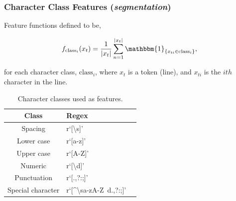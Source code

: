 \documentclass{beamer}
\begin{document}

\begin{frame}
\frametitle{Character Class Features (\emph{segmentation})}

Feature functions defined to be,

$$
f_{\text{class}_i}(x_t) = \frac{1}{|x_t|}\sum_{n=1}^{|x_t|} \mathbbm{1}_{\{x_{ti} \in \text{class}_i\}},
$$

for each character class, $\text{class}_i$, where $x_t$ is a token (line), and $x_{ti}$ is the $ith$ character in the line.

\begin{table}[h]
\begin{center}
\begin{tabular}{|c|l|l|}
\hline
Class & Regex\\
\hline
\hline
Spacing & r`[\textbackslash s]'\\
Lower case & r`[a-z]'\\
Upper case & r`[A-Z]'\\
Numeric & r`[\textbackslash d]'\\
Punctuation & r`[\(\).,?:;]'\\
Special character & r`[\^{}\textbackslash sa-zA-Z\ d\(\).,?:;]'\\
\hline
\end{tabular}
\caption[]{Character classes used as features.}
\end{center}
\end{table}

\end{frame}


\end{document}
